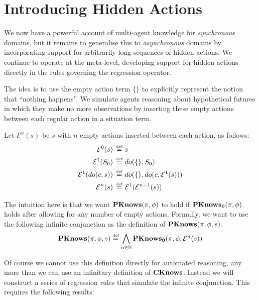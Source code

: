 \section{Introducing Hidden Actions\label{sub:Introducing-Hidden-Actions}}

We now have a powerful account of multi-agent knowledge for \emph{synchronous}
domains, but it remains to generalise this to \emph{asynchronous}
domains by incorporating support for arbitrarily-long sequences of
hidden actions. We continue to operate at the meta-level, developing
support for hidden actions directly in the rules governing the regression
operator.

The idea is to use the empty action term $\{\}$ to explicitly represent
the notion that {}``nothing happens''. We simulate agents reasoning
about hypothetical futures in which they make no more observations
by inserting these empty actions between each regular action in a
situation term.

\begin{defn}
Let $\mathcal{E}^{n}(s)$ be $s$ with $n$ empty actions inserted
between each action, as follows:\begin{align*}
\mathcal{E}^{0}(s)\,\stackrel{\mbox{\tiny def}}{=}\,\, & s\\
\mathcal{E}^{1}(S_{0})\,\stackrel{\mbox{\tiny def}}{=}\,\, & do(\{\},S_{0})\\
\mathcal{E}^{1}(do(c,s))\,\stackrel{\mbox{\tiny def}}{=}\,\, & do(\{\},do(c,\mathcal{E}^{1}(s)))\\
\mathcal{E}^{n}(s)\,\stackrel{\mbox{\tiny def}}{=}\,\, & \mathcal{E}^{1}(\mathcal{E}^{n-1}(s))\end{align*}

\end{defn}
The intuition here is that we want $\mathbf{PKnows}(\pi,\phi)$ to hold if
$\mathbf{PKnows_{0}}(\pi,\phi)$ holds after allowing for any number of empty
actions. Formally, we want to use the following infinite conjunction
as the definition of $\mathbf{PKnows}(\pi,\phi,s)$:\[
\mathbf{PKnows}(\pi,\phi,s)\stackrel{\mbox{\tiny def}}{=}\bigwedge_{n\in\mathbb{N}}\mathbf{PKnows_{0}}(\pi,\phi,\mathcal{E}^{n}(s))\]


Of course we cannot use this definition directly for automated reasoning,
any more than we can use an infinitary definition of $\mathbf{CKnows}$. Instead
we will construct a series of regression rules that simulate the infinite
conjunction. This requires the following results:

